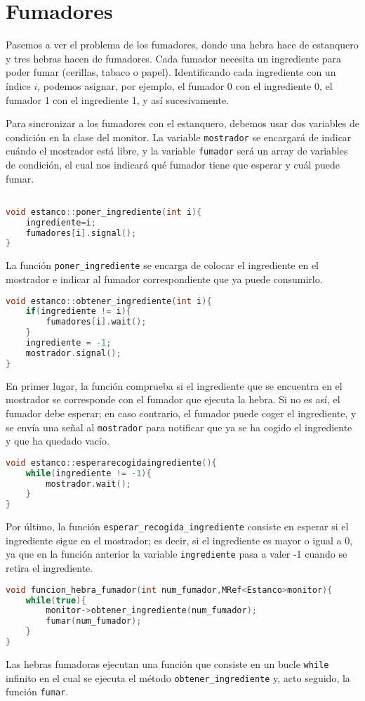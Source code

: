 \documentclass{article}
\begin{document}
\section{Fumadores}
Pasemos a ver el problema de los fumadores, donde una hebra hace de estanquero y tres hebras hacen de fumadores. Cada fumador necesita un ingrediente para poder fumar (cerillas, tabaco o papel). Identificando cada ingrediente con un índice \(i\), podemos asignar, por ejemplo, el fumador 0 con el ingrediente 0, el fumador 1 con el ingrediente 1, y así sucesivamente.

Para sincronizar a los fumadores con el estanquero, debemos usar dos variables de condición en la clase del monitor. La variable \texttt{mostrador} se encargará de indicar cuándo el mostrador está libre, y la variable \texttt{fumador} será un array de variables de condición, el cual nos indicará qué fumador tiene que esperar y cuál puede fumar.


\begin{lstlisting}[language=C++,caption=función poner_ingrediente]

void estanco::poner_ingrediente(int i){
	ingrediente=i;
	fumadores[i].signal();
}
\end{lstlisting}
La función \texttt{poner\_ingrediente} se encarga de colocar el ingrediente en el mostrador e indicar al fumador correspondiente que ya puede consumirlo. 

\begin{lstlisting}[language=C++,caption=función obtener_ingrediente ] 
void estanco::obtener_ingrediente(int i){
	if(ingrediente != i){
		fumadores[i].wait();
	}
	ingrediente = -1;
	mostrador.signal();
}
\end{lstlisting}
En primer lugar, la función comprueba si el ingrediente que se encuentra en el mostrador se corresponde con el fumador que ejecuta la hebra. Si no es así, el fumador debe esperar; en caso contrario, el fumador puede coger el ingrediente, y se envía una señal al \texttt{mostrador} para notificar que ya se ha cogido el ingrediente y que ha quedado vacío.


\begin{lstlisting}[language=C++,caption=función esperar_recogida_ingrediente] 
void estanco::esperarecogidaingrediente(){
	while(ingrediente != -1){
		mostrador.wait();
	}
}
\end{lstlisting}
Por último, la función \texttt{esperar\_recogida\_ingrediente} consiste en esperar si el ingrediente sigue en el mostrador; es decir, si el ingrediente es mayor o igual a 0, ya que en la función anterior la variable \texttt{ingrediente} pasa a valer -1 cuando se retira el ingrediente.
\begin{lstlisting}[language=C++,caption=función fumadores] 
void funcion_hebra_fumador(int num_fumador,MRef<Estanco>monitor){
	while(true){
		monitor->obtener_ingrediente(num_fumador);
		fumar(num_fumador);
	}
}
\end{lstlisting}
Las hebras fumadoras ejecutan una función que consiste en un bucle \texttt{while} infinito en el cual se ejecuta el método \texttt{obtener\_ingrediente} y, acto seguido, la función \texttt{fumar}.
\end{document}
